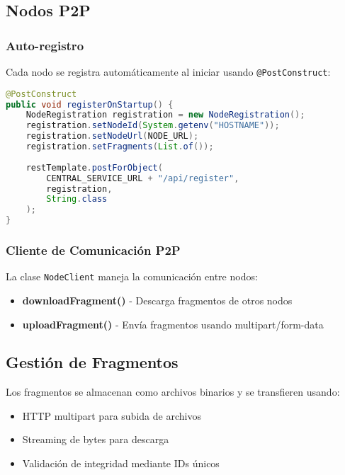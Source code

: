 \subsection*{Nodos P2P}

\subsubsection*{Auto-registro}

Cada nodo se registra automáticamente al iniciar usando \texttt{@PostConstruct}:

\begin{lstlisting}[language=Java]
@PostConstruct
public void registerOnStartup() {
    NodeRegistration registration = new NodeRegistration();
    registration.setNodeId(System.getenv("HOSTNAME"));
    registration.setNodeUrl(NODE_URL);
    registration.setFragments(List.of());
    
    restTemplate.postForObject(
        CENTRAL_SERVICE_URL + "/api/register",
        registration,
        String.class
    );
}
\end{lstlisting}

\subsubsection*{Cliente de Comunicación P2P}

La clase \texttt{NodeClient} maneja la comunicación entre nodos:

\begin{itemize}
    \item \textbf{downloadFragment()} - Descarga fragmentos de otros nodos
    \item \textbf{uploadFragment()} - Envía fragmentos usando multipart/form-data
\end{itemize}

\subsection*{Gestión de Fragmentos}

Los fragmentos se almacenan como archivos binarios y se transfieren usando:
\begin{itemize}
    \item HTTP multipart para subida de archivos
    \item Streaming de bytes para descarga
    \item Validación de integridad mediante IDs únicos
\end{itemize}

